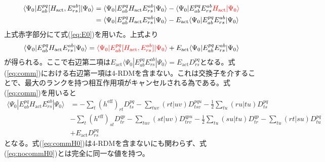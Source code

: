 \documentclass[11pt,pra,aps]{revtex4}
\newcommand{\red}[1]{\textcolor{red}{#1}}
\begin{document}
\begin{align}
  \langle\Psi_0|E^{pq}_{ab}[H_\text{act},E_{rs}^{ab}]|\Psi_0\rangle&=\langle\Psi_0|E^{pq}_{ab}H_\text{act}E_{rs}^{ab}|\Psi_0\rangle-\langle\Psi_0|E^{pq}_{ab}E_{rs}^{ab}\red{H_\text{act}|\Psi_0\rangle} \nonumber \\
  &=\langle\Psi_0|E^{pq}_{ab}H_\text{act}E_{rs}^{ab}|\Psi_0\rangle-E_\text{act}\langle\Psi_0|E^{pq}_{ab}E_{rs}^{ab}|\Psi_0\rangle
\end{align}
上式赤字部分にて式(\ref{eq:E0})を用いた。上式より
\begin{align}
  \langle\Psi_0|E^{pq}_{ab}H_\text{act}E_{rs}^{ab}|\Psi_0\rangle=\red{\langle\Psi_0|E^{pq}_{ab}[H_\text{act},E_{rs}^{ab}]|\Psi_0\rangle}+E_\text{act}\langle\Psi_0|E^{pq}_{ab}E_{rs}^{ab}|\Psi_0\rangle \label{eq:comm}
\end{align}
が得られる。ここで右辺第二項は$E_\text{act}\langle\Psi_0|E^{pq}_{ab}E_{rs}^{ab}|\Psi_0\rangle=E_\text{act}D^{pq}_{rs}$となる。式(\ref{eq:comm})における右辺第一項は4-RDMを含まない。これは交換子を介することで、最大のランクを持つ相互作用項がキャンセルされる為である。式(\ref{eq:comm})を用いると
\begin{align}
  \langle\Psi_0|E^{pq}_{ab}H_\text{act}E_{rs}^{ab}|\Psi_0\rangle &= - \sum_{t} (h^\text{eff})_{rt} D^{pq}_{ts} - \sum_{tuv} (rt|uv) D^{pqu}_{tsv} - \frac{1}{2} \sum_{tu} (ru|tu) D^{pq}_{ts} \nonumber \\
  &- \sum_{t} (h^\text{eff})_{st} D^{qp}_{tr} - \sum_{tuv} (st|uv) D^{qpu}_{trv} - \frac{1}{2} \sum_{tu} (su|tu) D^{qp}_{tr} - \sum_{tu} (rt|su) D^{pq}_{tu} \nonumber \\
  &+E_\text{act}D^{pq}_{rs} \label{eq:commH0}
\end{align}
となる。式(\ref{eq:commH0})は4-RDMを含まないにも関わらず、式(\ref{eq:nocommH0})とは完全に同一な値を持つ。
\end{document}
